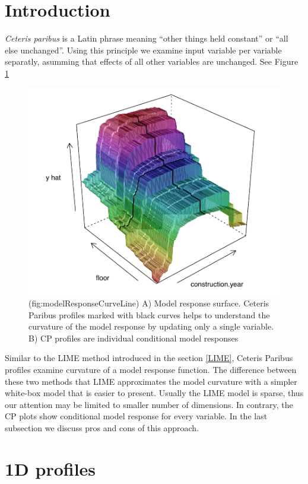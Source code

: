 \documentclass[]{book}
\theoremstyle{definition}
\theoremstyle{definition}
\theoremstyle{definition}
\theoremstyle{remark}
\begin{document}
\hypertarget{introduction-1}{%
\section{Introduction}\label{introduction-1}}

\emph{Ceteris paribus} is a Latin phrase meaning ``other things held
constant'' or ``all else unchanged''. Using this principle we examine
input variable per variable separatly, asumming that effects of all
other variables are unchanged. See Figure
\ref{fig:modelResponseCurveLine}

\begin{figure}

{\centering \includegraphics[width=0.7\linewidth]{figure/model_response_line} 

}

\caption{(fig:modelResponseCurveLine) A) Model response surface. Ceteris Paribus profiles marked with black curves helps to understand the curvature of the model response by updating only a single variable. B) CP profiles are individual conditional model responses}\label{fig:modelResponseCurveLine}
\end{figure}

Similar to the LIME method introduced in the section \ref{LIME}, Ceteris
Paribus profiles examine curvature of a model response function. The
difference between these two methods that LIME approximates the model
curvature with a simpler white-box model that is easier to present.
Usually the LIME model is sparse, thus our attention may be limited to
smaller number of dimensions. In contrary, the CP plots show conditional
model response for every variable. In the last subsection we discuss
pros and cons of this approach.

\hypertarget{ceterisParibus1d}{%
\section{1D profiles}\label{ceterisParibus1d}}
\end{document}
